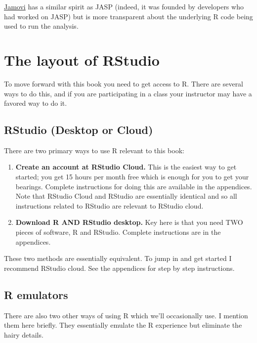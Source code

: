\documentclass[
]{book}
\providecommand{\tightlist}{%
  \setlength{\itemsep}{0pt}\setlength{\parskip}{0pt}}
\begin{document}
\href{https://www.jamovi.org/}{Jamovi} has a similar spirit as JASP (indeed, it was founded by developers who had worked on JASP) but is more transparent about the underlying R code being used to run the analysis.

\hypertarget{the-layout-of-rstudio}{%
\chapter{The layout of RStudio}\label{the-layout-of-rstudio}}

To move forward with this book you need to get access to R. There are several ways to do this, and if you are participating in a class your instructor may have a favored way to do it.

\hypertarget{rstudio-desktop-or-cloud}{%
\section{RStudio (Desktop or Cloud)}\label{rstudio-desktop-or-cloud}}

There are two primary ways to use R relevant to this book:

\begin{enumerate}
\def\labelenumi{\arabic{enumi}.}
\tightlist
\item
  \textbf{Create an account at RStudio Cloud.} This is the easiest way to get started; you get 15 hours per month free which is enough for you to get your bearings. Complete instructions for doing this are available in the appendices. Note that RStudio Cloud and RStudio are essentially identical and so all instructions related to RStudio are relevant to RStudio cloud.\\
\item
  \textbf{Download R AND RStudio desktop.} Key here is that you need TWO pieces of software, R and RStudio. Complete instructions are in the appendices.
\end{enumerate}

These two methods are essentially equivalent. To jump in and get started I recommend RStudio cloud. See the appendices for step by step instructions.

\hypertarget{r-emulators}{%
\section{R emulators}\label{r-emulators}}

There are also two other ways of using R which we'll occasionally use. I mention them here briefly. They essentially emulate the R experience but eliminate the hairy details.
\end{document}
